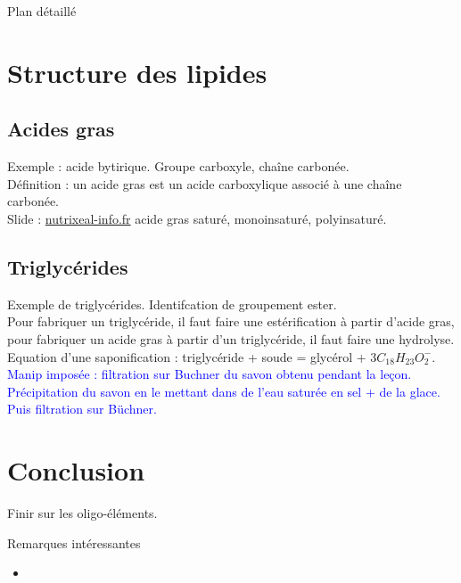 \begin{reportBlock}{Plan détaillé}
\section{Structure des lipides}
\subsection{Acides gras}
Exemple : acide bytirique. Groupe carboxyle, chaîne carbonée.\\

Définition : un acide gras est un acide carboxylique associé à une chaîne carbonée.\\

Slide : \url{nutrixeal-info.fr} acide gras saturé, monoinsaturé, polyinsaturé.

\subsection{Triglycérides}
Exemple de triglycérides. Identifcation de groupement ester.\\

Pour fabriquer un triglycéride, il faut faire une estérification à partir d'acide gras, pour fabriquer un acide gras à partir d'un triglycéride, il faut faire une hydrolyse.\\

Equation d'une saponification : triglycéride + soude = glycérol + 3$C_{18}H_{23}O_2^-$.\\

\textcolor{blue}{Manip imposée : filtration sur Buchner du savon obtenu pendant la leçon. Précipitation du savon en le mettant dans de l'eau saturée en sel + de la glace. Puis filtration sur Büchner.}

\section*{Conclusion}
Finir sur les oligo-éléments.

\end{reportBlock}

\begin{reportBlock}{Remarques intéressantes}

   \begin{itemize}
       \item 
  \end{itemize}
    
\end{reportBlock}